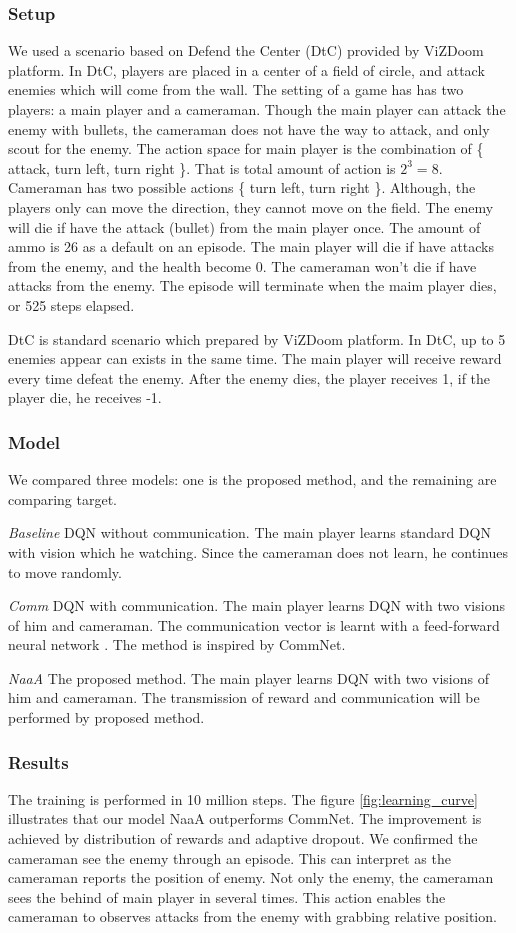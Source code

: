 \subsubsection{Setup}
We used a scenario based on Defend the Center (DtC) provided by ViZDoom platform.
In DtC, players are placed in a center of a field of circle, and attack enemies which will come from the wall.
The setting of a game has has two players: a main player and a cameraman.
Though the main player can attack the enemy with bullets, 
the cameraman does not have the way to attack, and only scout for the enemy.
The action space for main player is the combination of \{ attack, turn left, turn right \}. That is total amount of action is $2^3 = 8$.
Cameraman has two possible actions \{ turn left, turn right \}.
Although, the players only can move the direction, they cannot move on the field.
The enemy will die if have the attack (bullet) from the main player once.
The amount of ammo is 26 as a default on an episode.
The main player will die if have attacks from the enemy, and the health become 0.
The cameraman won't die if have attacks from the enemy.
The episode will terminate when the maim player dies, or 525 steps elapsed.

DtC is standard scenario which prepared by ViZDoom platform.
In DtC, up to 5 enemies appear can exists in the same time. 
The main player will receive reward every time defeat the enemy.
After the enemy dies, the player receives 1, if the player die, he receives -1.

\subsubsection{Model}
We compared three models: one is the proposed method, and the remaining are comparing target.

{\em Baseline} DQN without communication. The main player learns standard DQN with vision which he watching.
Since the cameraman does not learn, he continues to move randomly.

{\em Comm} DQN with communication. The main player learns DQN with two visions of him and cameraman.
The communication vector is learnt with a feed-forward neural network .  The method is inspired by CommNet.

{\em NaaA} The proposed method. The main player learns DQN with two visions of him and cameraman.
The transmission of reward and communication will be performed by proposed method.

\subsubsection{Results}
The training is performed in 10 million steps.
The figure \ref{fig:learning_curve} illustrates that our model NaaA outperforms CommNet.
The improvement is achieved by distribution of rewards and adaptive dropout.
We confirmed the cameraman see the enemy through an episode.
This can interpret as the cameraman reports the position of enemy.
Not only the enemy, the cameraman sees the behind of main player in several times.
This action enables the cameraman to observes attacks from the enemy with grabbing relative position.

